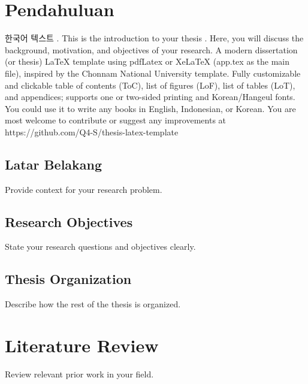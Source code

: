\cleardoublepage %
\mainmatterpagenumbers %

\chapter{Pendahuluan}

한국어 텍스트 \cite{reference1}. This is the introduction to your thesis \cite{reference2}. Here, you will discuss the background, motivation, and objectives of your research. 
A modern dissertation (or thesis) LaTeX template using pdfLatex or XeLaTeX (app.tex as the main file), inspired by the Chonnam National University template. Fully customizable and clickable table of contents (ToC), list of figures (LoF), list of tables (LoT), and appendices; supports one or two-sided printing and Korean/Hangeul fonts. You could use it to write any books in English, Indonesian, or Korean. You are most welcome to contribute or suggest any improvements at https://github.com/Q4-S/thesis-latex-template

\section{Latar Belakang}

\noindent Provide context for your research problem.

\section{Research Objectives}

State your research questions and objectives clearly.

\section{Thesis Organization}

\noindent Describe how the rest of the thesis is organized.

\chapter{Literature Review}

Review relevant prior work in your field.

